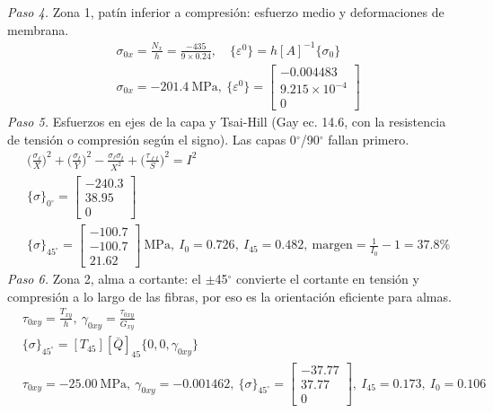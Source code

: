 \documentclass[11pt]{article}
\begin{document}
\textit{Paso 4.} Zona 1, patín inferior a compresión: esfuerzo medio y deformaciones de membrana.
\begin{align*}
&\sigma_{0x}=\frac{N_x}{h}=\frac{-435}{9\times0.24},\quad \{\varepsilon^0\}=h[A]^{-1}\{\sigma_0\} \\
&\sigma_{0x}=-201.4\ \mathrm{MPa},\ \{\varepsilon^0\}=\begin{bmatrix}-0.004483 \\ 9.215\times10^{-4} \\ 0\end{bmatrix}
\end{align*}
\textit{Paso 5.} Esfuerzos en ejes de la capa y Tsai-Hill (Gay ec. 14.6, con la resistencia de tensión o compresión según el signo). Las capas 0\ensuremath{^\circ}/90\ensuremath{^\circ} fallan primero.
\begin{align*}
&\Big(\frac{\sigma_\ell}{X}\Big)^2+\Big(\frac{\sigma_t}{Y}\Big)^2-\frac{\sigma_\ell\sigma_t}{X^2}+\Big(\frac{\tau_{\ell t}}{S}\Big)^2=I^2 \\
&\{\sigma\}_{0^\circ}=\begin{bmatrix}-240.3 \\ 38.95 \\ 0\end{bmatrix} \\
&\{\sigma\}_{45^\circ}=\begin{bmatrix}-100.7 \\ -100.7 \\ 21.62\end{bmatrix}\ \mathrm{MPa},\ I_{0}=0.726,\ I_{45}=0.482,\ \text{margen}=\tfrac1{I_0}-1=37.8\%
\end{align*}
\textit{Paso 6.} Zona 2, alma a cortante: el \ensuremath{\pm}45\ensuremath{^\circ} convierte el cortante en tensión y compresión a lo largo de las fibras, por eso es la orientación eficiente para almas.
\begin{align*}
&\tau_{0xy}=\frac{T_{xy}}{h},\ \gamma_{0xy}=\frac{\tau_{0xy}}{G_{xy}} \\
&\{\sigma\}_{45^\circ}=[T_{45}][\bar Q]_{45}\{0,0,\gamma_{0xy}\} \\
&\tau_{0xy}=-25.00\ \mathrm{MPa},\ \gamma_{0xy}=-0.001462,\ \{\sigma\}_{45^\circ}=\begin{bmatrix}-37.77 \\ 37.77 \\ 0\end{bmatrix},\ I_{45}=0.173,\ I_{0}=0.106
\end{align*}
\end{document}
